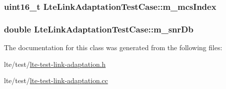 \subsubsection[{\texorpdfstring{m\+\_\+mcs\+Index}{m_mcsIndex}}]{\setlength{\rightskip}{0pt plus 5cm}uint16\+\_\+t Lte\+Link\+Adaptation\+Test\+Case\+::m\+\_\+mcs\+Index\hspace{0.3cm}{\ttfamily [private]}}\hypertarget{classLteLinkAdaptationTestCase_aa3bde4e95bfaf9a596550cf476c3cfc5}{}\label{classLteLinkAdaptationTestCase_aa3bde4e95bfaf9a596550cf476c3cfc5}
\subsubsection[{\texorpdfstring{m\+\_\+snr\+Db}{m_snrDb}}]{\setlength{\rightskip}{0pt plus 5cm}double Lte\+Link\+Adaptation\+Test\+Case\+::m\+\_\+snr\+Db\hspace{0.3cm}{\ttfamily [private]}}\hypertarget{classLteLinkAdaptationTestCase_ae48411edbef532314f5031f8a5371cca}{}\label{classLteLinkAdaptationTestCase_ae48411edbef532314f5031f8a5371cca}


The documentation for this class was generated from the following files\+:\begin{DoxyCompactItemize}
\item 
lte/test/\hyperlink{lte-test-link-adaptation_8h}{lte-\/test-\/link-\/adaptation.\+h}\item 
lte/test/\hyperlink{lte-test-link-adaptation_8cc}{lte-\/test-\/link-\/adaptation.\+cc}\end{DoxyCompactItemize}

